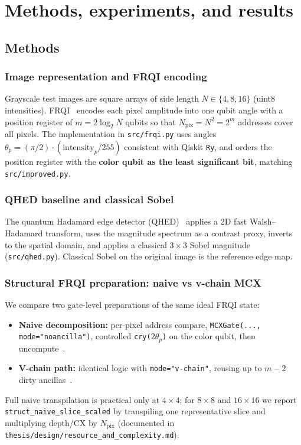 \chapter{Methods, experiments, and results}\label{ch:methods}
\thispagestyle{pagestyle}

\graphicspath{{../../outputs/}{images/}}

\section{Methods}

\subsection{Image representation and FRQI encoding}
Grayscale test images are square arrays of side length $N \in \{4,8,16\}$ (uint8 intensities). FRQI~\cite{Le2011FRQI} encodes each pixel amplitude into one qubit angle with a position register of $m = 2\log_2 N$ qubits so that $N_{\mathrm{pix}} = N^2 = 2^m$ addresses cover all pixels. The implementation in \texttt{src/frqi.py} uses angles $\theta_p = (\pi/2)\cdot (\mathrm{intensity}_p/255)$ consistent with Qiskit \texttt{Ry}, and orders the position register with the \textbf{color qubit as the least significant bit}, matching \texttt{src/improved.py}.

\subsection{QHED baseline and classical Sobel}
The quantum Hadamard edge detector (QHED)~\cite{Yao2017QHED,QiskitTextbookQuantumEdgeDetection} applies a 2D fast Walsh--Hadamard transform, uses the magnitude spectrum as a contrast proxy, inverts to the spatial domain, and applies a classical $3\times 3$ Sobel magnitude (\texttt{src/qhed.py}). Classical Sobel on the original image is the reference edge map.

\subsection{Structural FRQI preparation: naive vs v-chain MCX}
We compare two gate-level preparations of the same ideal FRQI state:
\begin{itemize}
  \item \textbf{Naive decomposition:} per-pixel address compare, \texttt{MCXGate(..., mode="noancilla")}, controlled \texttt{cry($2\theta_p$)} on the color qubit, then uncompute~\cite{Zindorf2024EfficientMCG}.
  \item \textbf{V-chain path:} identical logic with \texttt{mode="v-chain"}, reusing up to $m-2$ dirty ancillas~\cite{Vale2023MCSU2,Azevedo2024LowDepthMCG}.
\end{itemize}
Full naive transpilation is practical only at $4\times 4$; for $8\times 8$ and $16\times 16$ we report \texttt{struct\_naive\_slice\_scaled} by transpiling one representative slice and multiplying depth/CX by $N_{\mathrm{pix}}$ (documented in \texttt{thesis/design/resource\_and\_complexity.md}).

